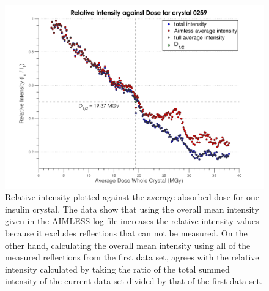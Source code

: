 \begin{figure}
  \centering
    \includegraphics[width=1\textwidth]{figures/dwd/calcrelint.pdf}
    \caption{Relative intensity plotted against the average absorbed dose for one insulin crystal. The data show that using the overall mean intensity given in the AIMLESS log file increases the relative intensity values because it excludes reflections that can not be measured. On the other hand, calculating the overall mean intensity using all of the measured reflections from the first data set, agrees with the relative intensity calculated by taking the ratio of the total summed intensity of the current data set divided by that of the first data set.}
    \label{figrelint}
\end{figure}
